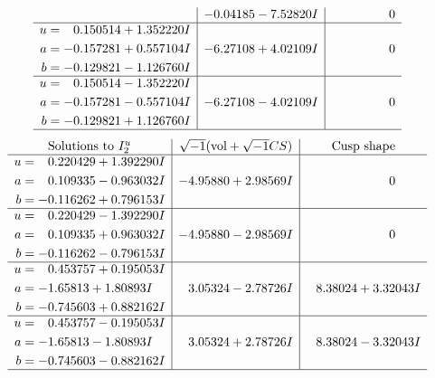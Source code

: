 \documentclass[1p]{elsarticle_modified}
\theoremstyle{definition}
\newcommand{\I}{\sqrt{-1}}
\begin{document}
$$\begin{array}{c|c|c}
 & -0.04185 - 7.52820 I & \phantom{-0.000000 } 0 \\ \hline\begin{aligned}
u &= \phantom{-}0.150514 + 1.352220 I \\
a &= -0.157281 + 0.557104 I \\
b &= -0.129821 - 1.126760 I\end{aligned}
 & -6.27108 + 4.02109 I & \phantom{-0.000000 } 0 \\ \hline\begin{aligned}
u &= \phantom{-}0.150514 - 1.352220 I \\
a &= -0.157281 - 0.557104 I \\
b &= -0.129821 + 1.126760 I\end{aligned}
 & -6.27108 - 4.02109 I & \phantom{-0.000000 } 0\\
 \hline 
 \end{array}$$\newpage$$\begin{array}{c|c|c}  
\text{Solutions to }I^u_{2}& \I (\text{vol} + \sqrt{-1}CS) & \text{Cusp shape}\\
 \hline 
\begin{aligned}
u &= \phantom{-}0.220429 + 1.392290 I \\
a &= \phantom{-}0.109335 - 0.963032 I \\
b &= -0.116262 + 0.796153 I\end{aligned}
 & -4.95880 + 2.98569 I & \phantom{-0.000000 } 0 \\ \hline\begin{aligned}
u &= \phantom{-}0.220429 - 1.392290 I \\
a &= \phantom{-}0.109335 + 0.963032 I \\
b &= -0.116262 - 0.796153 I\end{aligned}
 & -4.95880 - 2.98569 I & \phantom{-0.000000 } 0 \\ \hline\begin{aligned}
u &= \phantom{-}0.453757 + 0.195053 I \\
a &= -1.65813 + 1.80893 I \\
b &= -0.745603 + 0.882162 I\end{aligned}
 & \phantom{-}3.05324 - 2.78726 I & \phantom{-}8.38024 + 3.32043 I \\ \hline\begin{aligned}
u &= \phantom{-}0.453757 - 0.195053 I \\
a &= -1.65813 - 1.80893 I \\
b &= -0.745603 - 0.882162 I\end{aligned}
 & \phantom{-}3.05324 + 2.78726 I & \phantom{-}8.38024 - 3.32043 I\\
 \hline 
 \end{array}$$\newpage
\end{document}
